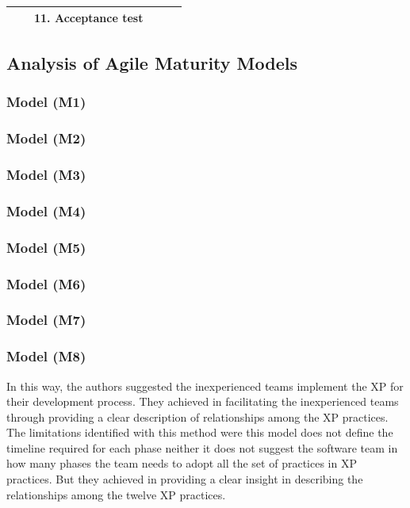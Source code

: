 \documentclass[a4paper,oneside]{bth}
\begin{document}
\begin{longtable}{|p{1.3cm}|p{2cm}|p{2cm}|p{2.7cm}|p{2cm} |p{2cm} |}
				&                                                      & 11. Acceptance test                                         &                                                                                                     &                                                        &                                                                                              \\ \hline

		
\end{longtable}
\subsection{Analysis of Agile Maturity Models}
\subsubsection{Model (M1)}

\subsubsection{Model (M2)}

\subsubsection{Model (M3)}

\subsubsection{Model (M4)}

\subsubsection{Model (M5)}

\subsubsection{Model (M6)}

\subsubsection{Model (M7)}

\subsubsection{Model (M8)}
In this way, the authors suggested the inexperienced teams implement the XP for their development process. They achieved in facilitating the inexperienced teams through providing a clear description of relationships among the XP practices. The limitations identified with this method were this model does not define the timeline required for each phase neither it does not suggest the software team in how many phases the team needs to adopt all the set of practices in XP practices. But they achieved in providing a clear insight in describing the relationships among the twelve XP practices.\\
\end{document}
